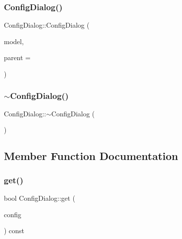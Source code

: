 \subsubsection{\texorpdfstring{ConfigDialog()}{ConfigDialog()}}
{\footnotesize\ttfamily Config\+Dialog\+::\+Config\+Dialog (\begin{DoxyParamCaption}\item[{\mbox{\hyperlink{class_displace_model}{Displace\+Model}} $\ast$}]{model,  }\item[{Q\+Widget $\ast$}]{parent = {} }\end{DoxyParamCaption})\hspace{0.3cm}{\ttfamily [explicit]}}

\mbox{\label{class_config_dialog_a485badac4dffa04603f800bb9d396e1d}} 
\subsubsection{\texorpdfstring{$\sim$ConfigDialog()}{~ConfigDialog()}}
{\footnotesize\ttfamily Config\+Dialog\+::$\sim$\+Config\+Dialog (\begin{DoxyParamCaption}{ }\end{DoxyParamCaption})}



\subsection{Member Function Documentation}
\mbox{\label{class_config_dialog_a7caf87325a4d9d4137e50c3ee5adf63a}} 
\subsubsection{\texorpdfstring{get()}{get()}}
{\footnotesize\ttfamily bool Config\+Dialog\+::get (\begin{DoxyParamCaption}\item[{\mbox{\hyperlink{class_config}{Config}} \&}]{config }\end{DoxyParamCaption}) const}

\mbox{\label{class_config_dialog_ac8481aa32a601a50690ec8c07e48d8e4}} 
